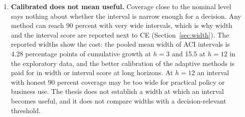\begin{enumerate}
\item \textbf{Calibrated does not mean useful.} Coverage close to the nominal level says nothing about whether the interval is narrow enough for a decision. Any method can reach 90 percent with very wide intervals, which is why width and the interval score are reported next to CE (Section~\ref{sec:width}). The reported widths show the cost: the pooled mean width of ACI intervals is 4.28 percentage points of cumulative growth at $h=3$ and 15.5 at $h=12$ in the exploratory data, and the better calibration of the adaptive methods is paid for in width or interval score at long horizons. At $h=12$ an interval with honest 90 percent coverage may be too wide for practical policy or business use. The thesis does not establish a width at which an interval becomes useful, and it does not compare widths with a decision-relevant threshold.
\end{enumerate}
